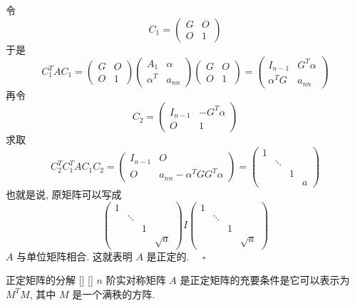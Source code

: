 \documentclass[UTF8]{ctexart}
\DeclareMathOperator{\0}{\mathbf{0}}
\DeclareMathOperator{\<}{\langle}
\renewcommand{\>}{\rangle}
\begin{document}
\begin{prf}
			\noindent 令\[ C_1=\begin{pmatrix}
				G&O\\O&1
			\end{pmatrix}
			\]
			于是\[
			C_1^TAC_1=\begin{pmatrix}
				G&O\\O&1
			\end{pmatrix} \begin{pmatrix}
				A_1&\alpha\\\alpha^T&a_{nn}
			\end{pmatrix}\begin{pmatrix}
				G&O\\O&1
			\end{pmatrix}=\begin{pmatrix}
				I_{n-1}&G^T\alpha\\\alpha^TG&a_{nn}
			\end{pmatrix}\]
			再令\[ C_2=\begin{pmatrix}
				I_{n-1}&-G^T\alpha\\O&1
			\end{pmatrix} \]
			求取\[ C_2^TC_1^TAC_1C_2=
			\begin{pmatrix}
				I_{n-1}&O\\O&a_{nn}-\alpha^TGG^T\alpha
			\end{pmatrix}=\begin{pmatrix}
				1&&&\\ &\ddots&&\\ &&1&\\ &&&a
			\end{pmatrix}\]
			也就是说, 原矩阵可以写成\[\begin{pmatrix}
				1&&&\\ &\ddots&&\\ &&1&\\ &&&\sqrt{a}
			\end{pmatrix}I\begin{pmatrix}
				1&&&\\ &\ddots&&\\ &&1&\\ &&&\sqrt{a}
			\end{pmatrix}
			\]
			 \(A\) 与单位矩阵相合. 这就表明 \(A\) 是正定的.  \(\quad\square\) 
		\end{prf}

		\begin{thm}
			[]
			{正定矩阵的分解}
			[]
			[]
			 \(n\) 阶实对称矩阵 \(A\) 是正定矩阵的充要条件是它可以表示为 \(M^TM\), 其中 \(M\) 是一个满秩的方阵.
		\end{thm}
\end{document}
